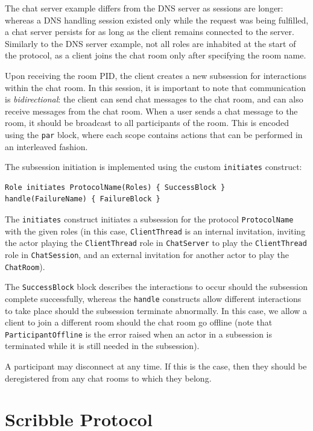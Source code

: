 \documentclass[a4paper]{article}
\begin{document}
The chat server example differs from the DNS server as sessions are longer: whereas a DNS handling session existed only while the request was being fulfilled, a chat server persists for as long as the client remains connected to the server. Similarly to the DNS server example, not all roles are inhabited at the start of the protocol, as a client joins the chat room only after specifying the room name.

Upon receiving the room PID, the client creates a new subsession for interactions within the chat room. In this session, it is important to note that communication is \emph{bidirectional}: the client can send chat messages to the chat room, and can also receive messages from the chat room. When a user sends a chat message to the room, it should be broadcast to all participants of the room. This is encoded using the \texttt{par} block, where each scope contains actions that can be performed in an interleaved fashion. 

The subsession initiation is implemented using the custom \texttt{initiates} construct: 

\begin{lstlisting}[language=scribble]
Role initiates ProtocolName(Roles) { SuccessBlock } handle(FailureName) { FailureBlock } 
\end{lstlisting}

The \texttt{initiates} construct initiates a subsession for the protocol \texttt{ProtocolName} with the given roles (in this case, \texttt{ClientThread} is an internal invitation, inviting the actor playing the \texttt{ClientThread} role in \texttt{ChatServer} to play the \texttt{ClientThread} role in \texttt{ChatSession}, and an external invitation for another actor to play the \texttt{ChatRoom}).

The \texttt{SuccessBlock} block describes the interactions to occur should the subsession complete successfully, whereas the \texttt{handle} constructs allow different interactions to take place should the subsession terminate abnormally. In this case, we allow a client to join a different room should the chat room go offline (note that \texttt{ParticipantOffline} is the error raised when an actor in a subsession is terminated while it is still needed in the subsession).

A participant may disconnect at any time. If this is the case, then they should be deregistered from any chat rooms to which they belong.

\section{Scribble Protocol}
\end{document}
